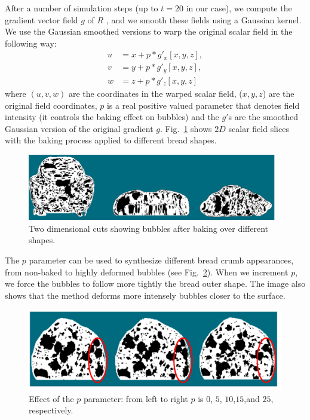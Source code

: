\documentclass[spanish,a4paper,11pt,oneside,links]{report}
\begin{document}
After a number of simulation steps (up to $t=20$ in our case), we compute the gradient vector field $g$ of $R$ \cite{Gonzalez2006}, and we smooth these fields using a Gaussian kernel.
We use the Gaussian smoothed versions to warp the original scalar field in the following way:
\begin{align*}
\displaystyle
u &= x+p*g'_{x}[x,y,z],\\
v &= y+p*g'_{y}[x,y,z],\\
w &= z+p*g'_{z}[x,y,z]
\end{align*}
where $(u,v,w)$ are the coordinates in the warped scalar field, ($x,y,z$) are the original field coordinates, $p$ is a real positive valued parameter that denotes field intensity (it controls the baking effect on bubbles) and the $g'$s are the smoothed Gaussian version of the original gradient $g$.
Fig.~\ref{fg:bakedbubbles} shows $2D$ scalar field slices with the baking process applied to different bread shapes.

\begin{figure}
\includegraphics[width=19cm]{figures/bakedbubbles}
\caption{Two dimensional cuts showing bubbles after baking over different shapes.}
\label{fg:bakedbubbles}
\end{figure}

The $p$ parameter can be used to synthesize different bread crumb appearances, from non-baked to highly deformed bubbles (see Fig.~\ref{fg:parameterp}).
When we increment $p$, we force the bubbles to follow more tightly the bread outer shape. 
The image also shows that the method deforms more intensely bubbles closer to the surface.

\begin{figure}
\includegraphics[width=19cm]{figures/parameterp}
\caption{Effect of the $p$ parameter: from left to right $p$ is $0$, $5$, $10$,$15$,and $25$, respectively.}
\label{fg:parameterp}
\end{figure}
\end{document}

